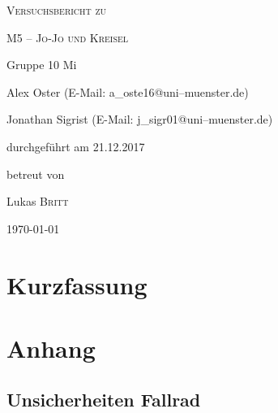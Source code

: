 \documentclass[11pt,a4paper,titlepage, ngerman]{article}
\begin{document}
	\begin{titlepage}
		\centering
		{\scshape\LARGE Versuchsbericht zu \par}
		\vspace{1cm}
		{\scshape\huge M5 -- Jo-Jo und Kreisel\par}
		\vspace{2.5cm}
		{\LARGE Gruppe 10 Mi\par}
		\vspace{0.5cm}
		{\large Alex Oster (E-Mail: a\_oste16@uni--muenster.de) \par}
		{\large Jonathan Sigrist (E-Mail: j\_sigr01@uni--muenster.de) \par}
		\vfill
		durchgeführt am 21.12.2017\par
		betreut von\par
		{\large Lukas \textsc{Britt}} 
		\vfill	
		{\large \today\par}
	\end{titlepage}
	
	\tableofcontents
	
	\newpage
	
	\section{Kurzfassung}
	
			
	\vspace{2cm} 
	
	 
	\newpage
	 
	
	
	\newpage
	
	\section{Anhang} \label{Anhang}
		
	
	\subsection{Unsicherheiten Fallrad}
	
\end{document}

